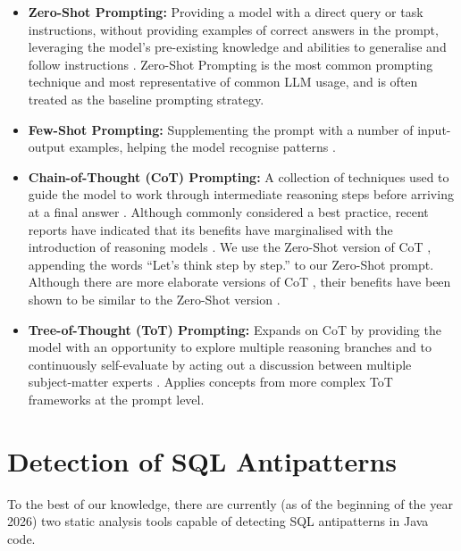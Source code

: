 \begin{itemize}
    \item \textbf{Zero-Shot Prompting:} Providing a model with a direct query or task instructions, without providing examples of correct answers in the prompt, leveraging the model's pre-existing knowledge and abilities to generalise and follow instructions . Zero-Shot Prompting is the most common prompting technique and most representative of common LLM usage, and is often treated as the baseline prompting strategy.
    \item \textbf{Few-Shot Prompting:} Supplementing the prompt with a number of input-output examples, helping the model recognise patterns .
    \item \textbf{Chain-of-Thought (CoT) Prompting:} A collection of techniques used to guide the model to work through intermediate reasoning steps before arriving at a final answer . Although commonly considered a best practice, recent reports have indicated that its benefits have marginalised with the introduction of reasoning models . We use the Zero-Shot version of CoT , appending the words “Let's think step by step.” to our Zero-Shot prompt. Although there are more elaborate versions of CoT , their benefits have been shown to be similar to the Zero-Shot version .
    \item \textbf{Tree-of-Thought (ToT) Prompting:} Expands on CoT by providing the model with an opportunity to explore multiple reasoning branches and to continuously self-evaluate by acting out a discussion between multiple subject-matter experts . Applies concepts from more complex ToT frameworks  at the prompt level.
\end{itemize}

\section{Detection of SQL Antipatterns}\label{sec:sqlDetection}

To the best of our knowledge, there are currently (as of the beginning of the year 2026) two static analysis tools capable of detecting SQL antipatterns in Java code.

